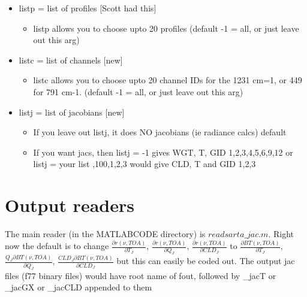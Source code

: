 \documentclass[11pt]{article}
\begin{document}
\begin{itemize}
\item   listp = list of profiles [Scott had this]
  \begin{itemize}
  \item listp allows you to choose upto 20 profiles (default -1 = all, or just
  leave out this arg)
  \end{itemize}  
\item   listc = list of channels [new]
  \begin{itemize}
  \item listc allows you to choose upto 20 channel IDs  for the 1231
  cm=1, or 449 for 791 cm-1. (default -1 = all, or just leave out this arg)
  \end{itemize}
\item   listj = list of jacobians [new]
  \begin{itemize}
  \item If you leave out listj, it does NO jacobians (ie radiance calcs) default

  \item If you want jacs, then listj = -1 gives WGT, T, GID 1,2,3,4,5,6,9,12
                                or listj = your list ,100,1,2,3    would give CLD, T and GID 1,2,3
  \end{itemize}
\end{itemize}

\section{Output readers}

The main reader (in the MATLABCODE directory) is $readsarta\_jac.m$. 
Right now the default is to change $\frac{\partial
  r(\nu,TOA)}{\partial T_J}$, $\frac{\partial r(\nu,TOA)}{\partial
  Q_J}$, $\frac{\partial r(\nu,TOA)}{\partial CLD_J}$ to
$\frac{\partial BT(\nu,TOA)}{\partial T_J}$, $\frac{Q_J \partial
  BT(\nu,TOA)}{\partial Q_J}$, $\frac{CLD_J \partial
  BT(\nu,TOA)}{\partial CLD_J}$ but this can easily be coded out. The
output jac files (f77 binary files) would have root name of fout,
followed by \_jacT or \_jacGX or \_jacCLD appended to them
\end{document}
